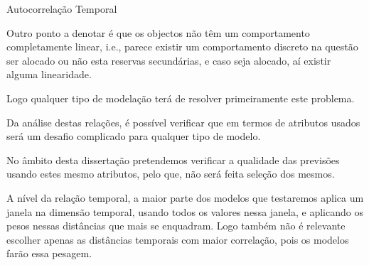 \begin{table}[H]
  \caption{Autocorrelação Temporal}    
  \resizebox{\linewidth}{!}{}
  \label{tab:tempcorr}
  \end{table}

Outro ponto a denotar é que os objectos não têm um comportamento completamente linear, i.e., parece existir um comportamento discreto na questão ser alocado ou não esta reservas secundárias, e caso seja alocado, aí existir alguma linearidade.\par
Logo qualquer tipo de modelação terá de resolver primeiramente este problema.\par
Da análise destas relações, é possível verificar que em termos de atributos usados será um desafio complicado para qualquer tipo de modelo.\par
No âmbito desta dissertação pretendemos verificar a qualidade das previsões usando estes mesmo atributos, pelo que, não será feita seleção dos mesmos.\par
A nível da relação temporal, a maior parte dos modelos que testaremos aplica um janela na dimensão temporal, usando todos os valores nessa janela, e aplicando os pesos nessas distâncias que mais se enquadram. Logo também não é relevante escolher apenas as distâncias temporais com maior correlação, pois os modelos farão essa pesagem.\par



